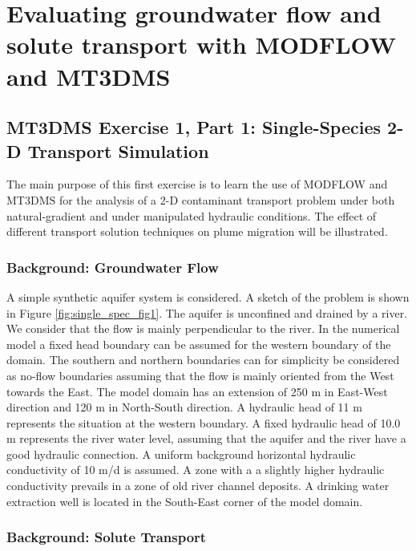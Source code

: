 \chapter{Evaluating groundwater flow and solute transport with MODFLOW and MT3DMS}
\def\shorttitle{Solute Transport} %
\section{MT3DMS Exercise 1, Part 1: Single-Species 2-D Transport Simulation}
The main purpose of this first exercise is to learn the use of MODFLOW and MT3DMS 
for the analysis of a 2-D contaminant transport problem under both 
natural-gradient and under manipulated hydraulic conditions. 
The effect of different transport solution techniques on 
plume migration will be illustrated.

\subsection{Background: Groundwater Flow}
A simple synthetic aquifer system is considered.
A sketch of the problem is shown in Figure \ref{fig:single_spec_fig1}. 
The aquifer is unconfined and drained by a river. We consider that the flow is mainly perpendicular
to the river. In the numerical model a fixed head boundary can be assumed 
for the western boundary of the domain. The southern and northern boundaries 
can for simplicity be considered as no-flow boundaries assuming that the flow is mainly 
oriented from the West towards the East. 
The model domain has an extension of 250 m in East-West direction and 120 m in North-South direction.
A hydraulic head of 11 m represents the situation at the western boundary. 
A fixed hydraulic head of 10.0 m represents the river water level, assuming that 
the aquifer and the river have a good hydraulic connection. 
A uniform background horizontal hydraulic conductivity of 10 m/d is assumed. 
A zone with a a slightly higher hydraulic conductivity prevails in a zone of old 
river channel deposits. A drinking water extraction 
well is located in the South-East corner of the model domain.


\subsection{Background: Solute Transport}

